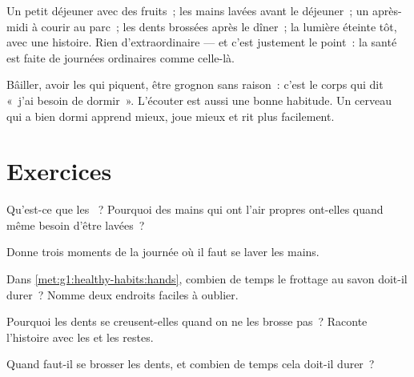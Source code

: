 \begin{example}\label{ex:g1:healthy-habits:day}
Un petit déjeuner avec des fruits~; les mains lavées avant le
déjeuner~; un après-midi à courir au parc~; les dents brossées après
le dîner~; la lumière éteinte tôt, avec une histoire. Rien
d'extraordinaire --- et c'est justement le point~: la santé est
faite de journées ordinaires comme celle-là.
\end{example}

\begin{remark}\label{rem:g1:healthy-habits:tired}
Bâiller, avoir les  qui piquent, être grognon sans raison~: c'est
le corps qui dit «~j'ai besoin de dormir~». L'écouter est aussi une
bonne habitude. Un cerveau qui a bien dormi apprend mieux, joue
mieux et rit plus facilement.
\end{remark}

\section{Exercices}

\begin{exercise}[$\star$]\label{exo:g1:healthy-habits:1}
Qu'est-ce que les ~? Pourquoi des mains qui ont l'air
propres ont-elles quand même besoin d'être lavées~?
\end{exercise}

\begin{exercise}[$\star$]\label{exo:g1:healthy-habits:2}
Donne trois moments de la journée où il faut se laver les mains.
\end{exercise}

\begin{exercise}[$\star$]\label{exo:g1:healthy-habits:3}
Dans \cref{met:g1:healthy-habits:hands}, combien de temps le
frottage au savon doit-il durer~? Nomme deux endroits faciles à
oublier.
\end{exercise}

\begin{exercise}[$\star$]\label{exo:g1:healthy-habits:4}
Pourquoi les dents se creusent-elles quand on ne les brosse pas~?
Raconte l'histoire avec les  et les restes.
\end{exercise}

\begin{exercise}[$\star$]\label{exo:g1:healthy-habits:5}
Quand faut-il se brosser les dents, et combien de temps cela
doit-il durer~?
\end{exercise}

